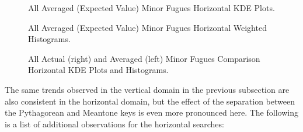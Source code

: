 \begin{figure}[H]
    \begin{center}
    \caption{All Averaged (Expected Value) Minor Fugues Horizontal KDE Plots. }
    \end{center}
\end{figure}
    



\begin{figure}[H]
    \begin{center}
    \caption{All Averaged (Expected Value) Minor Fugues Horizontal Weighted Histograms. }
    \end{center}
\end{figure}
    

    \begin{center}
    \end{center}
    


\begin{figure}[H]
    \begin{center}
    \caption[Actual and Averaged Minor Fugues Comparison Horizontal KDE Plots and Histograms. ]{All Actual (right) and Averaged (left) Minor Fugues Comparison Horizontal KDE Plots and Histograms.}
    \end{center}
\end{figure}
    
    The same trends observed in the vertical domain in the previous
subsection are also consistent in the horizontal domain, but the effect
of the separation between the Pythagorean and Meantone keys is even more
pronounced here. The following is a list of additional observations for
the horizontal searches:


